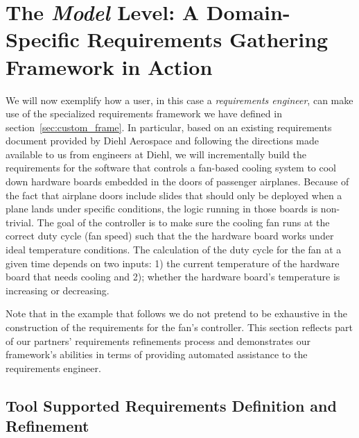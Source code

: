 \section{The \emph{Model} Level: A Domain-Specific Requirements Gathering
Framework in Action}
\label{sec:model}

We will now exemplify how a user, in this case a \emph{requirements engineer},
can make use of the specialized requirements framework we have defined in section~\ref{sec:custom_frame}.
In particular, based on an existing requirements document provided by Diehl
Aerospace and following the directions made available to us from engineers at
Diehl, we will incrementally build the requirements for the software that
controls a fan-based cooling system to cool down hardware boards embedded in
the doors of passenger airplanes.
Because of the fact that airplane doors include slides that should only be
deployed when a plane lands under specific conditions, the logic running in
those boards is non-trivial. The goal of the controller is to make
sure the cooling fan runs at the correct duty cycle (fan speed) such that the 
the hardware board works under ideal temperature conditions. The calculation of
the duty cycle for the fan at a given time depends on two inputs:
1) the current temperature of the hardware board that needs cooling and 2);
whether the hardware board's temperature is increasing or decreasing.
 

Note that in the example that follows we do not pretend to be exhaustive in the
construction of the requirements for the fan's controller. This section
reflects part of our partners' requirements refinements process and demonstrates
our framework's abilities in terms of providing automated assistance to the
requirements engineer. 

\subsection*{Tool Supported Requirements Definition and Refinement}

